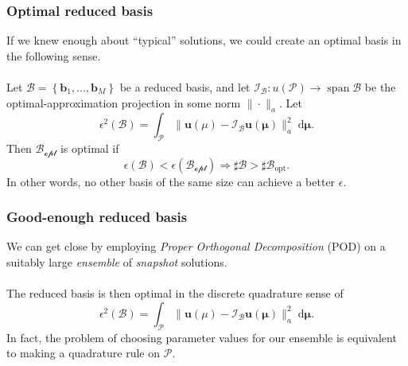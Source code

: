 \documentclass{beamer}
\DeclareMathOperator{\spann}{span}
\begin{document}
\begin{frame}
  \frametitle{Optimal reduced basis}

  If we knew enough about ``typical'' solutions, we could create an optimal basis in the following
  sense. \\~\\

  Let $\mathcal{B} = \left\{ \bm b_1, \ldots, \bm b_M \right\}$ be a reduced basis, and let
  $\mathcal{I}_{\mathcal{B}} : u(\mathcal{P}) \to \spann \mathcal{B}$ be the optimal-approximation
  projection in some norm $\| \cdot \|_a$. Let
  \[
    \epsilon^2(\mathcal{B}) = \int_{\mathcal{P}}
    \| \bm u(\mu) - \mathcal{I}_{\mathcal{B}} \bm u(\bm \mu) \|_a^2
    \; \text{d} \bm \mu.
  \]
  Then $\mathcal{B_\text{opt}}$ is optimal if
  \[
    \epsilon(\mathcal{B}) < \epsilon(\mathcal{B_\text{opt}}) \Longrightarrow
    \sharp \mathcal{B} > \sharp \mathcal{B}_\text{opt}.
  \]
  In other words, no other basis of the same size can achieve a better $\epsilon$.
\end{frame}

\begin{frame}
  \frametitle{Good-enough reduced basis}

  We can get close by employing \emph{Proper Orthogonal Decomposition} (POD) on a suitably large
  \emph{ensemble} of \emph{snapshot} solutions. \\~\\

  The reduced basis is then optimal in the discrete quadrature sense of
  \[
    \epsilon^2(\mathcal{B}) = \int_{\mathcal{P}}
    \| \bm u(\mu) - \mathcal{I}_{\mathcal{B}} \bm u(\bm \mu) \|_a^2
    \; \text{d} \bm \mu.
  \]
  In fact, the problem of choosing parameter values for our ensemble is equivalent to making a
  quadrature rule on $\mathcal{P}$.
\end{frame}
\end{document}
